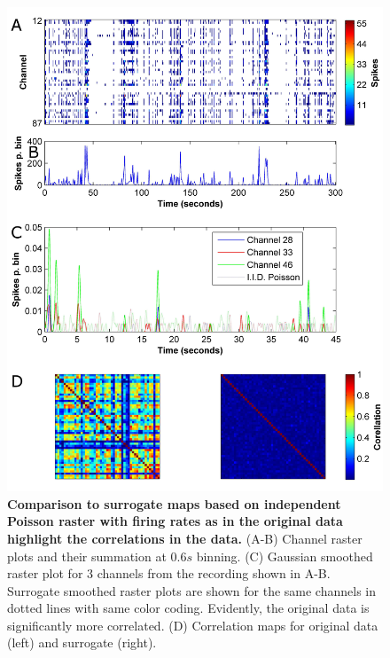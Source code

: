 \label{sec:methods:corrMaps}
\begin{figure}[!htb]
    \centering
    \includegraphics[width=14cm]{chapter2/figures/corrIllustration/corrIllustration.jpg}
    \caption[Computation of correlation maps]{\textbf{Comparison to surrogate maps based on independent Poisson raster with firing rates as in the original data highlight the correlations in the data.} (A-B) Channel raster plots and their summation at \(0.6s\) binning. (C) Gaussian smoothed raster plot for 3 channels from the recording shown in A-B. Surrogate smoothed raster plots are shown for the same channels in dotted lines with same color coding. Evidently, the original data is significantly more correlated. (D) Correlation maps for original data (left) and surrogate (right).}
    \label{fig:methods:corrIllustration}
\end{figure}
